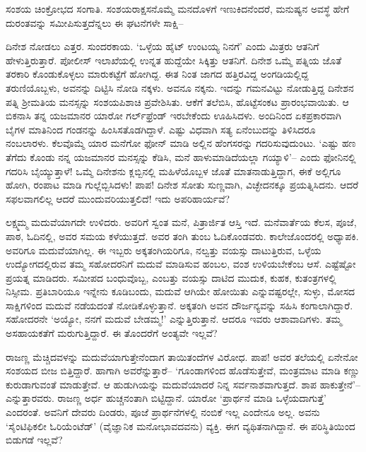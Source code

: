 
ಸಂಶಯ ಚಿಂಕ್ರೋಭದ ಸಂಗಾತಿ. ಸಂಶಯರಾಕ್ಷಸನೊಮ್ಮೆ ಮನದೊಳಗೆ ಇಣುಕಿದನೆಂದರೆ, ಮನುಷ್ಯನ ಅವಸ್ಥೆ ಹೇಗೆ ದುರಂತವನ್ನು ಸಮೀಪಿಸುತ್ತದೆನ್ನಲು ಈ ಘಟನೆಗಳೇ ಸಾಕ್ಷಿ–

ದಿನೇಶ ನೋಡಲು ಎತ್ತರ. ಸುಂದರಕಾಯ. ‘ಒಳ್ಳೆಯ ಹೈಟ್ ಉಂಟಯ್ಯ ನಿನಗೆ’ ಎಂದು ಮಿತ್ರರು ಆತನಿಗೆ ಹೇಳುತ್ತಿರುತ್ತಾರೆ. ಪೋಲೀಸ್ ಇಲಾಖೆಯಲ್ಲಿ ಉನ್ನತ ಹುದ್ದೆಯೇ ಸಿಕ್ಕಿತ್ತು ಆತನಿಗೆ. ದಿನೇಶ ಒಮ್ಮೆ ಪತ್ನಿಯ ಜೊತೆ ತರಕಾರಿ ಕೊಂಡುಕೊಳ್ಳಲು ಮಾರುಕಟ್ಟೆಗೆ ಹೋಗಿದ್ದ. ಈತ ನಿಂತ ಜಾಗದ ಹತ್ತಿರವಿದ್ದ ಅಂಗಡಿಯಲ್ಲಿದ್ದ ತರುಣಿಯೊಬ್ಬಳು, ಅವನನ್ನು ದಿಟ್ಟಿಸಿ ನೋಡಿ ನಕ್ಕಳು. ಅವನೂ ನಕ್ಕನು. ಇದನ್ನು ಗಮನವಿಟ್ಟು ನೋಡುತ್ತಿದ್ದ ದಿನೇಶನ ಪತ್ನಿ ಶ‍್ರೀಮತಿಯ ಮನಸ್ಸನ್ನು ಸಂಶಯಪಿಶಾಚಿ ಪ್ರವೇಶಿಸಿತು. ಆಕೆಗೆ ತಲೆಬಿಸಿ, ಹೊಟ್ಟೆಸಂಕಟ ಪ್ರಾರಂಭವಾಯಿತು. ಆ ಬಿಕನಾಸಿ ತನ್ನ ಯಜಮಾನರ ಯಾರೋ ಗರ್ಲ್​ಫ್ರೆಂಡ್ ಇರಬೇಕೆಂದು ಊಹಿಸಿದಳು. ಅಂದಿನಿಂದ ಏಕಪ್ರಕಾರವಾಗಿ ಬೈಗಳ ಮಾತಿನಿಂದ ಗಂಡನನ್ನು ಹಿಂಸಿಸತೊಡಗಿದ್ದಾಳೆ. ಎಷ್ಟು ವಿಧವಾಗಿ ಸತ್ಯ ಏನೆಂಬುದನ್ನು ತಿಳಿಸಿದರೂ ನಂಬಲಾರಳು. ಕೆಲವೊಮ್ಮೆ ಯಾರ ಮನೆಗೋ ಫೋನ್ ಮಾಡಿ ಅಲ್ಲಿನ ಹೆಂಗಸರನ್ನು ಗದರಿಸುವುದುಂಟು. ‘ಎಷ್ಟು ಹಣ ತೆಗೆದು ಕೊಂಡು ನನ್ನ ಯಜಮಾನರ ಮನಸ್ಸನ್ನು ಕೆಡಿಸಿ, ಮನೆ ಹಾಳುಮಾಡಿದೆಯಲ್ಲಾ ಗಯ್ಯಾಳಿ’– ಎಂದು ಫೋನಿನಲ್ಲಿ ಗದರಿಸಿ ಬೈಯ್ಯುತ್ತಾಳೆ! ಒಮ್ಮೆ ದಿನೇಶನು ಕ್ಲಬ್ಬಿನಲ್ಲಿ ಮಹಿಳೆಯೊಬ್ಬಳ ಜೊತೆ ಮಾತನಾಡುತ್ತಿದ್ದಾಗ, ಈಕೆ ಅಲ್ಲಿಗೂ ಹೋಗಿ, ರಂಪಾಟ ಮಾಡಿ ಗುಲ್ಲೆಬ್ಬಿಸಿದಳು! ಪಾಪ! ದಿನೇಶ ಸೋತು ಸುಣ್ಣವಾಗಿ, ವಿಚ್ಛೇದನಕ್ಕೂ ಪ್ರಯತ್ನಿಸಿದನು. ಆದರೆ ಸಫಲವಾಗಲಿಲ್ಲ ಆದರೆ  ಮುಂದುವರಿಯುತ್ತಲಿದೆ! ಇದು ಅಪರಿಹಾರ್ಯವೆ?

ಲಕ್ಷ್ಮಮ್ಮ ಮದುವೆಯಾಗದೇ ಉಳಿದರು. ಅವರಿಗೆ ಸ್ವಂತ ಮನೆ, ಪಿತ್ರಾರ್ಜಿತ ಆಸ್ತಿ ಇದೆ. ಮನೆವಾರ್ತೆಯ ಕೆಲಸ, ಪೂಜೆ, ಪಾಠ, ಓದಿನಲ್ಲಿ, ಅವರ ಸಮಯ ಕಳೆಯುತ್ತದೆ. ಅವರ ತಂಗಿ ತುಂಬ ಓದಿಕೊಂಡವರು. ಕಾಲೇಜೊಂದರಲ್ಲಿ ಅಧ್ಯಾಪಕಿ. ಅವರಿಗೂ ಮದುವೆಯಾಗಿಲ್ಲ. ಈ ಇಬ್ಬರು ಅಕ್ಕತಂಗಿಯರಿಗೂ, ನಲ್ವತ್ತು ವಯಸ್ಸು ದಾಟುತ್ತಿರುವ, ಒಳ್ಳೆಯ ಉದ್ಯೋಗದಲ್ಲಿರುವ ತಮ್ಮ ಸಹೋದರನಿಗೆ ಮದುವೆ ಮಾಡಿಸುವ ಹಂಬಲ, ವಂಶ ಉಳಿಯಬೇಕೆಂಬ ಆಸೆ. ಎಷ್ಟೆಷ್ಟೋ ಪ್ರಯತ್ನ ಮಾಡಿದರು. ಸಮೀಪದ ಬಂಧುವೊಬ್ಬ, ಎಂಬತ್ತು ವಯಸ್ಸು ದಾಟಿದ ಮುದುಕ, ಕುಹಕ, ಕುತಂತ್ರಗಳಲ್ಲಿ ನಿಸ್ಸೀಮ. ಪ್ರತಿಬಾರಿಯೂ ಇನ್ನೇನು ಕೂಡಿಬಂದು, ಮದುವೆ ಆಗಿಯೇ ಹೋಯಿತು ಎನ್ನುವಷ್ಟರಲ್ಲೇ, ಸುಳ್ಳು, ಮೋಸದ ಸಾಕ್ಷಿಗಳಿಂದ ಮದುವೆ ನಡೆಯದಂತೆ ನೋಡಿ\-ಕೊಳ್ಳುತ್ತಾನೆ. ಅಕ್ಕತಂಗಿ ಅವನ ದೌರ್ಜನ್ಯವನ್ನು ಸಹಿಸಿ ಕಂಗಾಲಾಗಿದ್ದಾರೆ. ಸಹೋದರನೇ ‘ಅಯ್ಯೋ, ನನಗೆ ಮದುವೆ ಬೇಡಮ್ಮ!’ ಎನ್ನುತ್ತಿರುತ್ತಾನೆ. ಆದರೂ ಇವರು ಆಶಾವಾದಿಗಳು. ತಮ್ಮ ಅಸಹಾಯಕತೆಗೆ ಮರುಗುತ್ತಿದ್ದಾರೆ. ಈ ತೊಂದರೆಗೆ ಅಂತ್ಯವೇ ಇಲ್ಲವೆ?

ರಾಜಣ್ಣ ಮೆಚ್ಚಿದವಳನ್ನು ಮದುವೆಯಾಗುತ್ತೇನೆಂದಾಗ ತಾಯಿತಂದೆಗಳ ವಿರೋಧ. ಪಾಪ! ಅವರ ತಲೆಯಲ್ಲಿ ಏನೇನೋ ಸಂಶಯದ ಬೀಜ ಬಿತ್ತಿದ್ದಾರೆ. ಹಾಗಾಗಿ ಅವರೆನ್ನುತ್ತಾರೆ– ‘ಗೂಂಡಾಗಳಿಂದ ಹೊಡೆಸುತ್ತೇವೆ, ಮಂತ್ರಮಾಟ ಮಾಡಿ ಕಣ್ಣು ಕುರುಡಾಗುವಂತೆ ಮಾಡುತ್ತೇವೆ. ಆ ಹುಡುಗಿಯನ್ನು ಮದುವೆಯಾದರೆ ನಿನ್ನ ಸರ್ವನಾಶವಾಗುತ್ತದೆ. ಶಾಪ ಹಾಕುತ್ತೇನೆ’– ಎನ್ನುತ್ತಾರವರು. ರಾಜಣ್ಣ ಅರ್ಧ ಹುಚ್ಚನಂತಾಗಿ ಬಿಟ್ಟಿದ್ದಾನೆ. ಯಾರೋ ‘ಪ್ರಾರ್ಥನೆ ಮಾಡಿ ಒಳ್ಳೆಯದಾಗುತ್ತೆ’ ಎಂದರಂತೆ. ಅವನಿಗೆ ದೇವರು ದಿಂಡರು, ಪೂಜೆ ಪ್ರಾರ್ಥನೆಗಳಲ್ಲಿ ನಂಬಿಕೆ ಇಲ್ಲ ಎಂದೇನೂ ಅಲ್ಲ. ಅವನು ‘ಸೈಂಟಿಫಿಕಲೀ ಓರಿಯೆಂಟೆಡ್​’ (ವೈಜ್ಞಾನಿಕ ಮನೋಭಾವದವನು) ವ್ಯಕ್ತಿ. ಈಗ ವ್ಯಥಿತನಾಗಿದ್ದಾನೆ. ಈ ಪರಿಸ್ಥಿತಿಯಿಂದ ಬಿಡುಗಡೆ ಇಲ್ಲವೆ?


